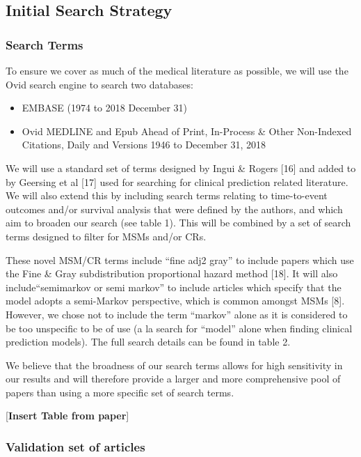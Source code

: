 \documentclass[12pt,PhD,twoside,openright]{muthesis}
\providecommand{\tightlist}{%
  \setlength{\itemsep}{0pt}\setlength{\parskip}{0pt}}
\begin{document}
\hypertarget{initial-search-strategy}{%
\subsection{Initial Search Strategy}\label{initial-search-strategy}}

\hypertarget{search-terms}{%
\subsubsection{Search Terms}\label{search-terms}}

To ensure we cover as much of the medical literature as possible, we will use the Ovid search engine to search two databases:
\begin{itemize}
\tightlist
\item
  EMBASE (1974 to 2018 December 31)
\item
  Ovid MEDLINE and Epub Ahead of Print, In-Process \& Other Non-Indexed Citations, Daily and Versions 1946 to December 31, 2018
\end{itemize}
We will use a standard set of terms designed by Ingui \& Rogers {[}16{]} and added to by Geersing et al {[}17{]} used for searching for clinical prediction related literature. We will also extend this by including search terms relating to time-to-event outcomes and/or survival analysis that were defined by the authors, and which aim to broaden our search (see table 1). This will be combined by a set of search terms designed to filter for MSMs and/or CRs.

These novel MSM/CR terms include ``fine adj2 gray'' to include papers which use the Fine \& Gray subdistribution proportional hazard method {[}18{]}. It will also include``semimarkov or semi markov'' to include articles which specify that the model adopts a semi-Markov perspective, which is common amongst MSMs {[}8{]}. However, we chose not to include the term ``markov'' alone as it is considered to be too unspecific to be of use (a la search for ``model'' alone when finding clinical prediction models). The full search details can be found in table 2.

We believe that the broadness of our search terms allows for high sensitivity in our results and will therefore provide a larger and more comprehensive pool of papers than using a more specific set of search terms.

{[}\textbf{Insert Table from paper}{]}

\hypertarget{validation-set-of-articles}{%
\subsubsection{Validation set of articles}\label{validation-set-of-articles}}
\end{document}

